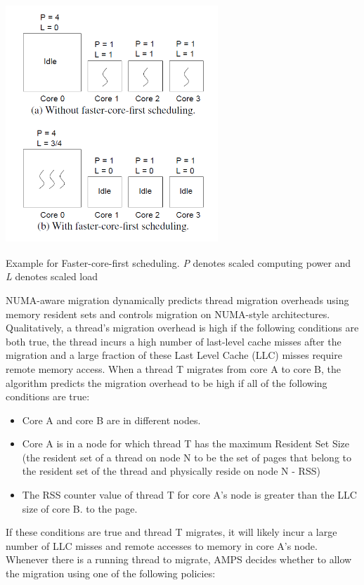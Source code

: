 \documentclass[a4paper,10pt]{article}
\makeatletter
\newenvironment{figurehere}{\def\@captype{figure}\vspace{2ex}}{\vspace{2ex}}
\makeatother
\begin{document}
\begin{multicols}{2}
\begin{figurehere}
 \centering
 \includegraphics[width=8cm, height=9cm]{./eps/fcf.PNG}
 \caption{Example for Faster-core-first scheduling. \emph{P} denotes scaled computing power and \emph{L} denotes scaled load}
 \label{fig:fcf}
\end{figurehere}

NUMA-aware migration dynamically predicts thread migration overheads using memory resident sets and controls migration on NUMA-style architectures.
Qualitatively, a thread's migration overhead is high if the following conditions are both true, the thread incurs a high number of last-level cache misses after the migration and a large fraction of these Last Level Cache (LLC) misses require remote memory access.
When a thread T migrates from core A to core B, the algorithm predicts the migration overhead to be high if all of the following conditions are true:

\begin{itemize}
    \item Core A and core B are in different nodes.
    \item Core A is in a node for which thread T has the maximum Resident Set Size (the resident set of a thread on node N to be the set of pages that belong to the resident set of the thread and physically reside on node N - RSS)
   \item The RSS counter value of thread T for core A's node is greater than the LLC size of core B.
to the page.
\end{itemize}

If these conditions are true and thread T migrates, it will likely incur a large number of LLC misses and remote accesses to memory in core A's node.
Whenever there is a running thread to migrate, AMPS decides whether to allow the migration using one of the following policies:


\end{multicols}
\end{document}
